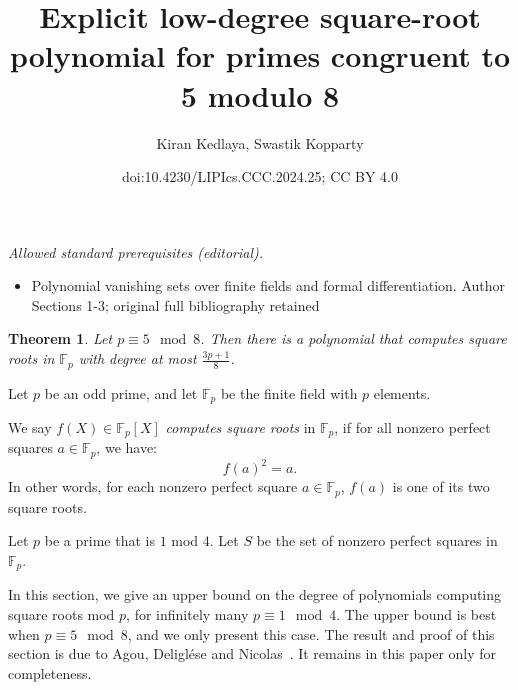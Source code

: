 \documentclass[10pt,a4paper]{article}
\title{Explicit low-degree square-root polynomial for primes congruent to 5 modulo 8}
\author{Kiran Kedlaya, Swastik Kopparty}
\date{doi:10.4230/LIPIcs.CCC.2024.25; CC BY 4.0}
\newtheorem{theorem}{Theorem}[section]
\newcommand{\F}{\mathbb{F}}
\begin{document}
\maketitle
\setcounter{section}{1}
\setcounter{theorem}{2}
\noindent\textit{Allowed standard prerequisites (editorial).}\begin{itemize}
\item Polynomial vanishing sets over finite fields and formal differentiation. Author Sections 1-3; original full bibliography retained
\end{itemize}\medskip
\begin{theorem}
\label{thm:5mod8}
 Let $p \equiv 5 \mod 8$. Then there is a polynomial that computes square roots in $\F_p$ with degree at most $\frac{3p+1}{8}$.
\end{theorem}

Let $p$ be an odd prime, and let $\F_p$ be the finite field with $p$ elements.

We say $f(X) \in \F_p[X]$ {\em computes square roots} in $\F_p$, if
for all nonzero perfect squares $a \in \F_p$, we have:
$$f(a)^2 = a.$$ In other words, for each nonzero perfect square $a \in \F_p$, $f(a)$ is one of its two square roots.

Let $p$ be a prime that is $1$ mod $4$. 
Let $S$ be the set of nonzero perfect squares in $\F_p$.

In this section, we give an upper bound on the degree of polynomials computing square roots mod $p$, for infinitely many $p \equiv 1 \mod 4$. The upper bound is best when $p \equiv 5 \mod 8$, and we only present this case. The result and proof of this section is due to Agou, Deligl{\'e}se and Nicolas~\cite{ADN-sqrt}. It remains in this paper only for completeness.
\end{document}
